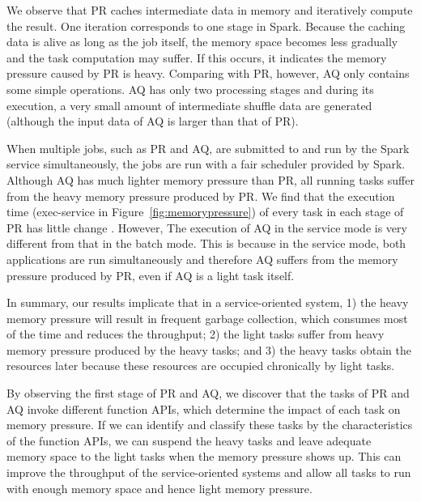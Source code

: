 We observe that PR caches intermediate data in memory and iteratively compute the result. One iteration corresponds to one stage in Spark. Because the caching data is alive as long as the job itself, the memory space becomes less gradually
and the task computation may suffer. If this occurs, it indicates the memory pressure caused by PR is heavy. Comparing with PR, however, AQ only contains some simple operations. AQ has only two processing stages and during its execution, a very small amount of intermediate shuffle data are generated (although the input data of AQ is larger than that of PR). 

When multiple jobs, such as PR and AQ, are submitted to and run by the Spark service simultaneously, the jobs are run with a fair scheduler provided by Spark. Although AQ has much lighter memory pressure than PR, all running tasks suffer from the heavy memory pressure produced by PR. We find that the execution time (exec-service in Figure~\ref{fig:memorypressure}) of every task in each stage of PR has little change
. However, The execution of AQ in the service mode is very different from that in the batch mode. This is because in the service mode, both applications are run simultaneously and therefore AQ suffers from the memory pressure produced by PR, even if AQ is a light task itself.

In summary, our results implicate that in a service-oriented system, 1) the heavy memory pressure will result in frequent garbage collection, which consumes most of the time and reduces the throughput; 2) the light tasks suffer from heavy memory pressure produced by the heavy tasks; and 3) the heavy tasks obtain the resources later because these resources are occupied chronically by light tasks.

By observing the first stage of PR and AQ, we discover that the tasks of PR and AQ invoke different function APIs, which determine the impact of each task on memory pressure. If we can identify and classify these tasks by the characteristics of the function APIs, we can suspend the heavy tasks and leave adequate memory space to the light tasks when the memory pressure shows up. This can improve the throughput of the service-oriented systems and allow all tasks to run with enough memory space and hence light memory pressure. 
  
